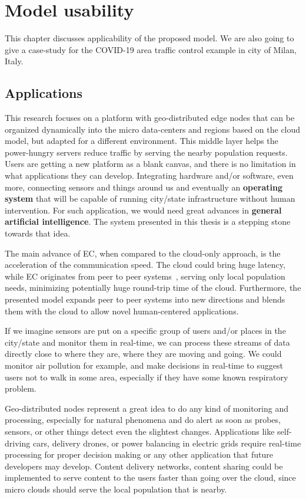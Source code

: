 \chapter{Model usability}\label{chapter:Model usability}
%
%
This chapter discusses applicability of the proposed model. We are also going to give a case-study for the COVID-19 area traffic control example in city of Milan, Italy.
%
\section{Applications}\label{sec:app}
%
This research focuses on a platform with geo-distributed edge nodes that can be organized dynamically into the micro data-centers and regions based on the cloud model, but adapted for a different environment. This middle layer helps the power-hungry servers reduce traffic by serving the nearby population requests. Users are getting a new platform as a blank canvas, and there is no limitation in what applications they can develop. Integrating hardware and/or software, even more, connecting sensors and things around us and eventually an \textbf{operating system} that will be capable of running city/state infrastructure without human intervention. For such application, we would need great advances in \textbf{general artificial intelligence}. The system presented in this thesis is a stepping stone towards that idea.

The main advance of EC, when compared to the cloud-only approach, is the acceleration of the communication speed. The cloud could bring huge latency, while EC originates from peer to peer systems~\cite{LopezMEDHIBFR15}, serving only local population needs, minimizing potentially huge round-trip time of the cloud. Furthermore, the presented model expands peer to peer systems into new directions and blends them with the cloud to allow novel human-centered applications. 

If we imagine sensors are put on a specific group of users and/or places in the city/state and monitor them in real-time, we can process these streams of data directly close to where they are, where they are moving and going. We could monitor air pollution for example, and make decisions in real-time to suggest users not to walk in some area, especially if they have some known respiratory problem.

Geo-distributed nodes represent a great idea to do any kind of monitoring and processing, especially for natural phenomena and do alert as soon as probes, sensors, or other things detect even the slightest changes. Applications like self-driving cars, delivery drones, or power balancing in electric grids require real-time processing for proper decision making or any other application that future developers may develop. Content delivery networks, content sharing could be implemented to serve content to the users faster than going over the cloud, since micro clouds should serve the local population that is nearby.
%
%
